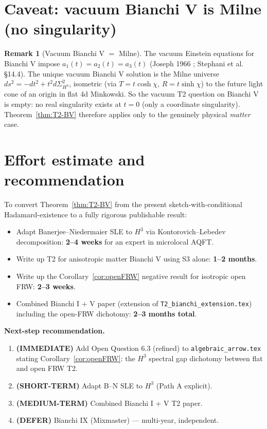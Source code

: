 \documentclass[11pt,a4paper]{article}
\theoremstyle{definition}
\newtheorem{remark}[theorem]{Remark}
\begin{document}
\section{Caveat: vacuum Bianchi V is Milne (no singularity)}

\begin{remark}[Vacuum Bianchi V $=$ Milne]\label{rem:vacuumBV}
The vacuum Einstein equations for Bianchi V impose $a_1(t)=a_2(t)=a_3(t)$
(Joseph 1966 \cite{Joseph1966}; Stephani et al.\ \cite{Stephani2003}
\S14.4). The unique vacuum Bianchi V solution is the Milne universe
$ds^2=-dt^2+t^2 d\Sigma_{H^3}^2$, isometric (via $T=t\cosh\chi$,
$R=t\sinh\chi$) to the future light cone of an origin in flat 4d
Minkowski. So the vacuum T2 question on Bianchi V is empty: no real
singularity exists at $t=0$ (only a coordinate singularity).
Theorem~\ref{thm:T2-BV} therefore applies only to the genuinely physical
\emph{matter} case.
\end{remark}

\section{Effort estimate and recommendation}

To convert Theorem~\ref{thm:T2-BV} from the present sketch-with-conditional
Hadamard-existence to a fully rigorous publishable result:

\begin{itemize}
  \item Adapt Banerjee--Niedermaier SLE to $H^3$ via Kontorovich--Lebedev
  decomposition: \textbf{2--4 weeks} for an expert in microlocal AQFT.
  \item Write up T2 for anisotropic matter Bianchi V using S3 alone:
  \textbf{1--2 months}.
  \item Write up the Corollary~\ref{cor:openFRW} negative result for
  isotropic open FRW: \textbf{2--3 weeks}.
  \item Combined Bianchi I + V paper (extension of
  \texttt{T2\_bianchi\_extension.tex}) including the open-FRW dichotomy:
  \textbf{2--3 months total}.
\end{itemize}

\textbf{Next-step recommendation.}
\begin{enumerate}
  \item \textbf{(IMMEDIATE)} Add Open Question 6.3 (refined) to
  \texttt{algebraic\_arrow.tex} stating Corollary~\ref{cor:openFRW}: the
  $H^3$ spectral gap dichotomy between flat and open FRW T2.
  \item \textbf{(SHORT-TERM)} Adapt B--N SLE to $H^3$ (Path A explicit).
  \item \textbf{(MEDIUM-TERM)} Combined Bianchi I + V T2 paper.
  \item \textbf{(DEFER)} Bianchi IX (Mixmaster) — multi-year, independent.
\end{enumerate}
\end{document}
